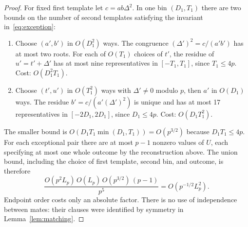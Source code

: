 \begin{proof}
For fixed first template let $c=ab\Delta^2$. In one bin $(D_1,T_1)$ there are two bounds on the number of second templates satisfying the invariant in~\eqref{eq:exception}:
\begin{enumerate}
\item Choose $(a',b')$ in $O(D_1^2)$ ways. The congruence $(\Delta')^2=c/(a'b')$ has at most two roots. For each of $O(T_1)$ choices of $t'$, the residue of $u'=t'+\Delta'$ has at most nine representatives in $[-T_1,T_1]$, since $T_1\le4p$. Cost: $O(D_1^2 T_1)$.
\item Choose $(t',u')$ in $O(T_1^2)$ ways with $\Delta'\ne0$ modulo $p$, then $a'$ in $O(D_1)$ ways. The residue $b'=c/(a'(\Delta')^2)$ is unique and has at most 17 representatives in $[-2D_1,2D_1]$, since $D_1\le4p$. Cost: $O(D_1 T_1^2)$.
\end{enumerate}
The smaller bound is $O(D_1T_1\min(D_1,T_1))=O(p^{3/2})$ because $D_1T_1\le4p$. For each exceptional pair there are at most $p-1$ nonzero values of $U$, each specifying at most one whole outcome by the reconstruction above. The union bound, including the choice of first template, second bin, and outcome, is therefore
\[
 \frac{O(p^2 L_p)\,O(L_p)\,O(p^{3/2})\,(p-1)}{p^5}
 =O(p^{-1/2}L_p^2).
\]
Endpoint order costs only an absolute factor. There is no use of independence between mates: their clauses were identified by symmetry in Lemma~\ref{lem:matching}.
\end{proof}
